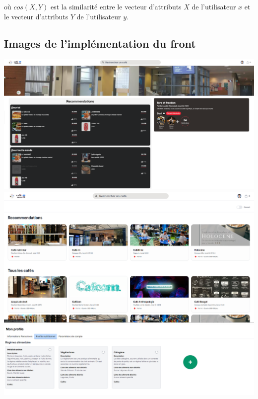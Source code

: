 \documentclass[11pt]{article}
\begin{document}
où $cos(X, Y)$ est la similarité entre le vecteur d'attributs $X$ de l'utilisateur $x$ et le vecteur d'attributs $Y$ de l'utilisateur $y$.


\newpage

\newpage
\subsection{Images de l'implémentation du front}
\label{images}

\includegraphics[scale=0.3]{images/recommendation_personnalises.png} \\

\includegraphics[scale=0.3]{images/recommendation_cafe.png} \\

\includegraphics[scale=0.4]{images/diet_profile.png} \\
\end{document}
